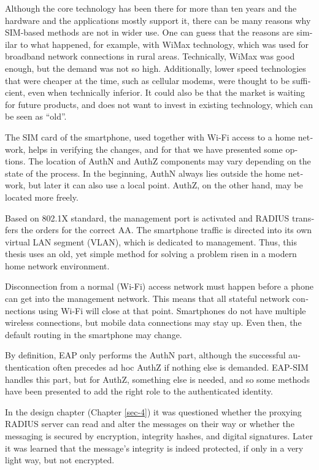 \documentclass[12pt,a4paper,english]{tutthesis}
\begin{document}
\begin{otherlanguage}{english}
Although the core technology has been there for more than ten years and
the hardware and the applications mostly support it, 
there can be many reasons why SIM-based methods are not in wider use. 
One can guess that the reasons are similar to what happened, for example, with 
WiMax technology, which was used for broadband network connections in
rural areas. Technically, WiMax was good enough, but the demand was not so
high. Additionally, lower speed technologies that were cheaper at the
time, such as cellular modems, were thought to be sufficient, even when
 technically inferior.
It could also be that the market is waiting for future products, and does 
not want to invest in existing technology, which can be seen as ``old''.



The SIM card of the smartphone, used together with Wi-Fi access to a home network, 
helps in verifying the changes, and for that we have presented some options.
The location of AuthN and AuthZ components may vary depending on the
state of the process.
In the beginning, AuthN always lies outside the home network, but
later it can also use a local point. AuthZ, on the other hand, may be located more freely.

Based on 802.1X standard, the management port is activated and
RADIUS transfers the orders for the correct AA.
The smartphone traffic is directed into its own virtual LAN segment (VLAN),
which is dedicated to management.
Thus, this thesis  uses an old, yet simple method for solving a
problem risen in a modern home network environment.

Disconnection from a normal (Wi-Fi) access network must happen before a phone can get
into the management network. This means that all stateful network
connections using Wi-Fi will close at that point. Smartphones do not
have multiple wireless connections, but mobile data connections may 
stay up. Even then, the default routing in the smartphone may change.


By definition, EAP only performs the AuthN part, although the successful
authentication often precedes ad hoc AuthZ if nothing else is demanded.
EAP-SIM handles this part, but for AuthZ, something else is needed,
and so some methods have been presented to add the right role to 
the authenticated identity.



In the design chapter (Chapter \ref{sec-4}) it was questioned whether the proxying RADIUS server
can read and alter the messages on their way or whether the messaging
is secured
by encryption, integrity hashes, and digital signatures.
Later it was learned that the message's integrity is indeed protected, if
only in a very light way, but not encrypted.


\end{otherlanguage}
\end{document}
